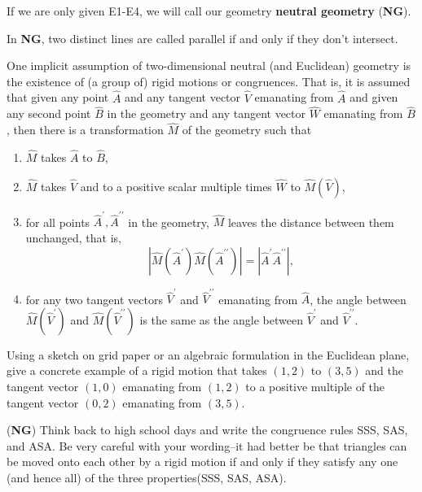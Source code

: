 \begin{definition}
If we are only given E1-E4, we will call our geometry \textbf{neutral
geometry} (\textbf{NG}).
\end{definition}

\begin{definition}
In \textbf{NG}, two distinct lines are called parallel if and only if they
don't intersect.
\end{definition}

One implicit assumption of two-dimensional neutral (and Euclidean)
geometry is the existence of (a group of) rigid motions or
congruences. That is, it is assumed that given any point $\hat{A}$ and
any tangent vector $\hat{V}$ emanating from $\hat{A}$ and given any
second point $\hat{B}$ in the geometry and any tangent vector
$\hat{W}$ emanating from $\hat{B}$, then there is a transformation
$\hat{M}$ of the geometry such that
\begin{enumerate}
\item $\hat{M}$ takes $\hat{A}$ to $\hat{B}$,
\item $\hat{M}$ takes $\hat{V}$ and to a positive scalar multiple times $\hat{W}$ to $\hat{M}\left( \hat{V}\right) $,
\item for all points $\hat{A}^{\prime},\hat{A}^{\prime\prime}$ in the
geometry, $\hat{M}$ leaves the distance between them unchanged, that
is,
\[
\left\vert \hat{M}\left(  \hat{A}^{\prime}\right)  \hat{M}\left(  \hat
{A}^{\prime\prime}\right) \right\vert =\left\vert \hat{A}^{\prime}\hat
{A}^{\prime\prime}\right\vert ,
\]
\item for any two tangent vectors $\hat{V}^{\prime}$ and
$\hat{V}^{\prime\prime}$ emanating from $\hat{A}$, the angle between
$\hat{M}\left( \hat{V}^{\prime }\right) $ and
$\hat{M}\left( \hat{V}^{\prime\prime}\right) $ is the same as the
angle between $\hat{V}^{\prime}$ and $\hat{V}^{\prime\prime}$.
\end{enumerate}


\begin{exercise}
Using a sketch on grid paper or an algebraic formulation in the
Euclidean plane, give a concrete example of a rigid motion that takes
$\left( 1,2\right) $ to $\left( 3,5\right) $ and the tangent vector
$\left( 1,0\right) $ emanating from $\left( 1,2\right) $ to a positive
multiple of the tangent vector $\left( 0,2\right) $ emanating from
$\left( 3,5\right)$.
\end{exercise}

\begin{exercise}
(\textbf{NG}) Think back to high school days and write the congruence
rules SSS, SAS, and ASA. Be very careful with your wording--it had
better be that triangles can be moved onto each other by a rigid
motion if and only if they satisfy any one (and hence all) of the
three properties(SSS, SAS, ASA).
\end{exercise}

